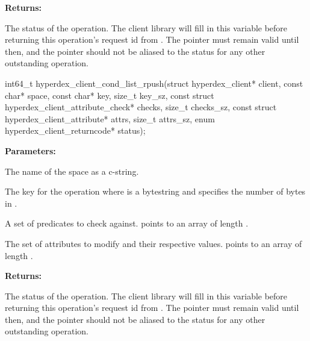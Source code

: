 \noindent\textbf{Returns:}
\begin{description}[labelindent=\widthof{{\code{status}}},leftmargin=*,noitemsep,nolistsep,align=right]
\item[\code{status}] The status of the operation.  The client library will fill in this variable before returning this operation's request id from .  The pointer must remain valid until then, and the pointer should not be aliased to the status for any other outstanding operation.
\end{description}

\funcsep
{}
\begin{ccode}
int64_t hyperdex_client_cond_list_rpush(struct hyperdex_client* client,
                const char* space,
                const char* key, size_t key_sz,
                const struct hyperdex_client_attribute_check* checks, size_t checks_sz,
                const struct hyperdex_client_attribute* attrs, size_t attrs_sz,
                enum hyperdex_client_returncode* status);
\end{ccode}
\funcdesc 

\noindent\textbf{Parameters:}
\begin{description}[labelindent=\widthof{{\code{checks}, \code{checks\_sz}}},leftmargin=*,noitemsep,nolistsep,align=right]
\item[\code{space}] The name of the space as a c-string.
\item[\code{key}, \code{key\_sz}] The key for the operation where  is a bytestring and  specifies the number of bytes in .
\item[\code{checks}, \code{checks\_sz}] A set of predicates to check against.   points to an array of length .
\item[\code{attrs}, \code{attrs\_sz}] The set of attributes to modify and their respective values.   points to an array of length .
\end{description}

\noindent\textbf{Returns:}
\begin{description}[labelindent=\widthof{{\code{status}}},leftmargin=*,noitemsep,nolistsep,align=right]
\item[\code{status}] The status of the operation.  The client library will fill in this variable before returning this operation's request id from .  The pointer must remain valid until then, and the pointer should not be aliased to the status for any other outstanding operation.
\end{description}

